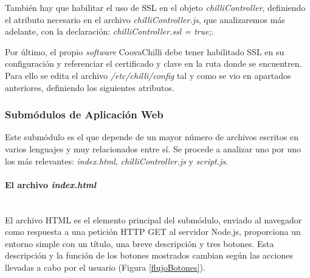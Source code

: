 También hay que habilitar el uso de SSL en el objeto \emph{chilliController}, definiendo el atributo necesario en el archivo \emph{chilliController.js}, que analizaremos más adelante, con la declaración: \emph{chilliController.ssl = true;}.

Por último, el propio \emph{software} CoovaChilli debe tener habilitado SSL en su configuración y referenciar el certificado y clave en la ruta donde se encuentren. Para ello se edita el archivo \emph{/etc/chilli/config} tal y como se vio en apartados anteriores, definiendo los siguientes atributos.


\subsubsection{Submódulos de Aplicación Web} \label{webAppSubmodule}

Este submódulo es el que depende de un mayor número de archivos escritos en varios lenguajes y muy relacionados entre sí. Se procede a analizar uno por uno los más relevantes: \emph{index.html}, \emph{chilliController.js} y \emph{script.js}.

\paragraph{El archivo \emph{index.html}} \label{index.html} ~\\

El archivo HTML es el elemento principal del submódulo, enviado al navegador como respuesta a una petición HTTP GET al servidor Node.js, proporciona un entorno simple con un título, una breve descripción y tres botones. Esta descripción y la función de los botones mostrados cambian según las acciones llevadas a cabo por el usuario (Figura \ref{flujoBotones}).

